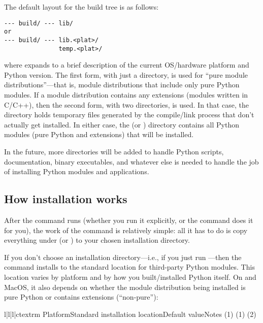 \documentclass{howto}
\begin{document}
The default layout for the build tree is as follows:
\begin{verbatim}
--- build/ --- lib/
or
--- build/ --- lib.<plat>/
               temp.<plat>/
\end{verbatim}
where  expands to a brief description of the current
OS/hardware platform and Python version.  The first form, with just a
 directory, is used for ``pure module distributions''---that
is, module distributions that include only pure Python modules.  If a
module distribution contains any extensions (modules written in C/C++),
then the second form, with two  directories, is used.  In
that case, the  directory holds temporary
files generated by the compile/link process that don't actually get
installed.  In either case, the  (or
) directory contains all Python modules (pure
Python and extensions) that will be installed.

In the future, more directories will be added to handle Python scripts,
documentation, binary executables, and whatever else is needed to handle
the job of installing Python modules and applications.


\subsection{How installation works}
\label{how-install-works}

After the  command runs (whether you run it explicitly,
or the  command does it for you), the work of the
 command is relatively simple: all it has to do is copy
everything under  (or )
to your chosen installation directory.

If you don't choose an installation directory---i.e., if you just run
---then the  command installs to
the standard location for third-party Python modules.  This location
varies by platform and by how you built/installed Python itself.  On
\UNIX{} and MacOS, it also depends on whether the module distribution
being installed is pure Python or contains extensions (``non-pure''):
\begin{tableiv}{l|l|l|c}{textrm}%
  {Platform}{Standard installation location}{Default value}{Notes}
          {}
          {}
          {(1)}
          {}
          {}
          {(1)}
          {}
          {}
          {(2)}
          {}
          {}
          {}
          {}
          {}
          {}
\end{tableiv}
\end{document}

